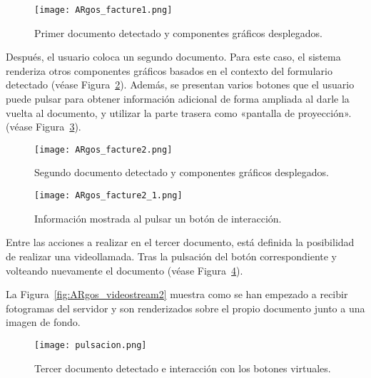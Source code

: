 \begin{figure}
  \begin{center}
    \texttt{[image: ARgos\_facture1.png]}
    \caption{Primer documento detectado y componentes gráficos desplegados.}
    \label{fig:ARgos_facture1}
  \end{center}
\end{figure}

Después, el usuario coloca un segundo documento. Para este caso, el sistema renderiza otros componentes gráficos basados en el contexto del formulario detectado (véase Figura~\ref{fig:ARgos_facture2}). Además, se presentan varios botones que el usuario puede pulsar para obtener información adicional de forma ampliada al darle la vuelta al documento, y utilizar la parte trasera como «pantalla de proyección». (véase Figura~\ref{fig:ARgos_facture2_1}).

\begin{figure}
  \begin{center}
    \texttt{[image: ARgos\_facture2.png]}
    \caption{Segundo documento detectado y componentes gráficos desplegados.}
    \label{fig:ARgos_facture2}
  \end{center}
\end{figure}

\begin{figure}
  \begin{center}
    \texttt{[image: ARgos\_facture2\_1.png]}
    \caption{Información mostrada al pulsar un botón de interacción.}
    \label{fig:ARgos_facture2_1}
  \end{center}
\end{figure}

Entre las acciones a realizar en el tercer documento, está definida la posibilidad de realizar una videollamada. Tras la pulsación del botón correspondiente y volteando nuevamente el documento (véase Figura~\ref{fig:ARgos_facture3}). 

La Figura~\ref{fig:ARgos_videostream2} muestra como se han empezado a recibir fotogramas del servidor y son renderizados sobre el propio documento junto a una imagen de fondo.

\begin{figure}
  \begin{center}
    \texttt{[image: pulsacion.png]}
    \caption{Tercer documento detectado e interacción con los botones virtuales.}
    \label{fig:ARgos_facture3}
  \end{center}
\end{figure}

